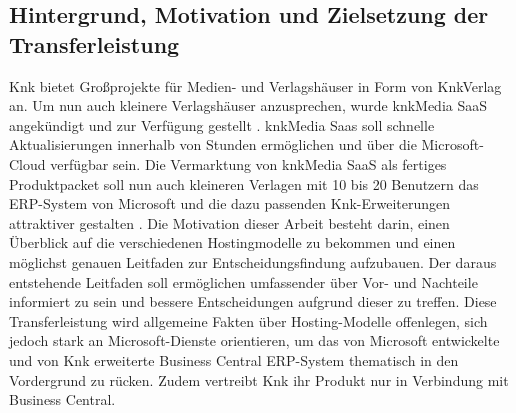 \documentclass[12pt,bibtotoc]{article}
\begin{document}
	\subsection{Hintergrund, Motivation und Zielsetzung der Transferleistung}
	Knk bietet Großprojekte für Medien- und Verlagshäuser in Form von KnkVerlag an. 
	Um nun auch kleinere Verlagshäuser anzusprechen, wurde knkMedia SaaS angekündigt und zur Verfügung gestellt \cite{knk-kuendigtSaaS-an.2023}.
	\newline
	knkMedia Saas soll schnelle Aktualisierungen innerhalb von Stunden ermöglichen und über die Microsoft-Cloud verfügbar sein.
	Die Vermarktung von knkMedia SaaS als fertiges Produktpacket soll nun auch kleineren Verlagen mit 10 bis 20 Benutzern das ERP-System von Microsoft und die dazu passenden Knk-Erweiterungen attraktiver gestalten \cite{knk-kuendigtSaaS-an.2023}.
	\newline
	Die Motivation dieser Arbeit besteht darin, einen Überblick auf die verschiedenen Hostingmodelle zu bekommen und einen möglichst genauen Leitfaden zur Entscheidungsfindung aufzubauen.
	Der daraus entstehende Leitfaden soll ermöglichen umfassender über Vor- und Nachteile informiert zu sein und bessere Entscheidungen aufgrund dieser zu treffen. 
	\newline
	Diese Transferleistung wird allgemeine Fakten über Hosting-Modelle offenlegen, sich jedoch stark an Microsoft-Dienste orientieren, um das von Microsoft entwickelte und von Knk erweiterte Business Central ERP-System 
	thematisch in den Vordergrund zu rücken. Zudem vertreibt Knk ihr Produkt nur in Verbindung mit Business Central.


\end{document}

